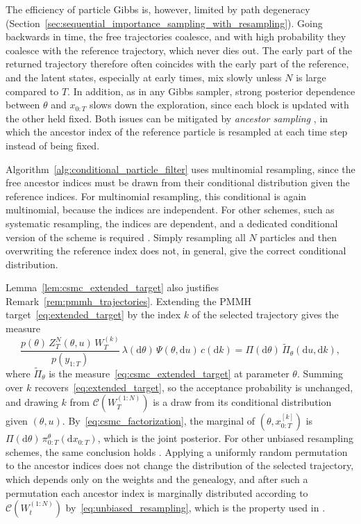 The efficiency of particle Gibbs is, however, limited by path degeneracy (Section~\ref{sec:sequential_importance_sampling_with_resampling}). Going backwards in time, the free trajectories coalesce, and with high probability they coalesce with the reference trajectory, which never dies out. The early part of the returned trajectory therefore often coincides with the early part of the reference, and the latent states, especially at early times, mix slowly unless $N$ is large compared to $T$. In addition, as in any Gibbs sampler, strong posterior dependence between $\theta$ and $x_{0:T}$ slows down the exploration, since each block is updated with the other held fixed. Both issues can be mitigated by \emph{ancestor sampling} \cite{lindsten2014ancestor}, in which the ancestor index of the reference particle is resampled at each time step instead of being fixed.

\begin{remark}
    Algorithm~\ref{alg:conditional_particle_filter} uses multinomial resampling, since the free ancestor indices must be drawn from their conditional distribution given the reference indices. For multinomial resampling, this conditional is again multinomial, because the indices are independent. For other schemes, such as systematic resampling, the indices are dependent, and a dedicated conditional version of the scheme is required \cite{chopin2020smc}. Simply resampling all $N$ particles and then overwriting the reference index does not, in general, give the correct conditional distribution.
\end{remark}

Lemma~\ref{lem:csmc_extended_target} also justifies Remark~\ref{rem:pmmh_trajectories}. Extending the PMMH target~\eqref{eq:extended_target} by the index $k$ of the selected trajectory gives the measure
\begin{equation}
    \frac{p(\theta)\,Z_T^N(\theta,u)\,W_T^{(k)}}{p(y_{1:T})}\,\lambda(\mathrm{d}\theta)\,\Psi(\theta,\mathrm{d}u)\,c(\mathrm{d}k) = \Pi(\mathrm{d}\theta)\,\tilde{\Pi}_\theta(\mathrm{d}u,\mathrm{d}k),
\end{equation}
where $\tilde{\Pi}_\theta$ is the measure~\eqref{eq:csmc_extended_target} at parameter $\theta$. Summing over $k$ recovers~\eqref{eq:extended_target}, so the acceptance probability is unchanged, and drawing $k$ from $\mathcal{C}(W_T^{(1:N)})$ is a draw from its conditional distribution given $(\theta,u)$. By~\eqref{eq:csmc_factorization}, the marginal of $(\theta,x_{0:T}^{[k]})$ is $\Pi(\mathrm{d}\theta)\,\pi_{0:T}^\theta(\mathrm{d}x_{0:T})$, which is the joint posterior. For other unbiased resampling schemes, the same conclusion holds \cite{andrieu2010particle}. Applying a uniformly random permutation to the ancestor indices does not change the distribution of the selected trajectory, which depends only on the weights and the genealogy, and after such a permutation each ancestor index is marginally distributed according to $\mathcal{C}(W_t^{(1:N)})$ by~\eqref{eq:unbiased_resampling}, which is the property used in \cite{andrieu2010particle}.

